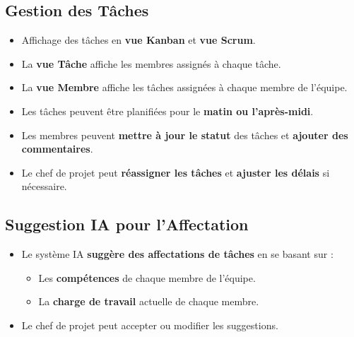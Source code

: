 \documentclass[11pt,a4paper]{report}
\begin{document}
\subsection{Gestion des Tâches}
\begin{tcolorbox}[enhanced, colback=lightgray, colframe=primarycolor, arc=2mm, boxrule=0.5pt, breakable]
    \begin{itemize}
        \item Affichage des tâches en \textbf{vue Kanban} et \textbf{vue Scrum}.
        \item La \textbf{vue Tâche} affiche les membres assignés à chaque tâche.
        \item La \textbf{vue Membre} affiche les tâches assignées à chaque membre de l'équipe.
        \item Les tâches peuvent être planifiées pour le \textbf{matin ou l'après-midi}.
        \item Les membres peuvent \textbf{mettre à jour le statut} des tâches et \textbf{ajouter des commentaires}.
        \item Le chef de projet peut \textbf{réassigner les tâches} et \textbf{ajuster les délais} si nécessaire.
    \end{itemize}
\end{tcolorbox}

\subsection{Suggestion IA pour l'Affectation}
\begin{tcolorbox}[enhanced, colback=lightgray, colframe=accentcolor, arc=2mm, boxrule=0.5pt, breakable, title={\color{white} Intelligence Artificielle}, fonttitle=\bfseries, coltitle=white, colbacktitle=accentcolor]
    \begin{itemize}
        \item Le système IA \textbf{suggère des affectations de tâches} en se basant sur :
              \begin{itemize}
                  \item Les \textbf{compétences} de chaque membre de l'équipe.
                  \item La \textbf{charge de travail} actuelle de chaque membre.
              \end{itemize}
        \item Le chef de projet peut accepter ou modifier les suggestions.
    \end{itemize}
\end{tcolorbox}
\end{document}
